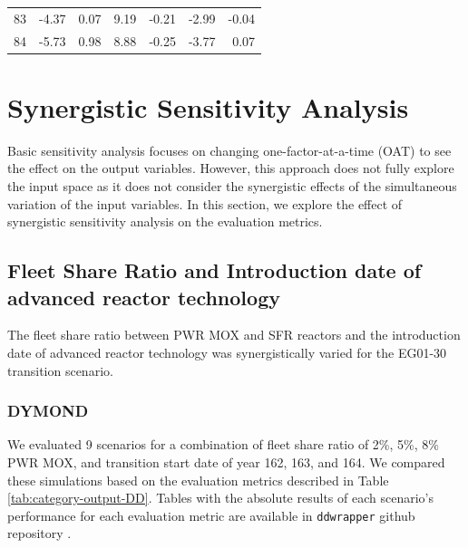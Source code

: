 \begin{table}[]
\begin{tabularx}{\textwidth}{R|RRRRRR}
            83  & -4.37            & 0.07                           & 9.19          & -0.21                       & -2.99             & -0.04                           \\
            84 & -5.73            & 0.98                           & 8.88          & -0.25                       & -3.77             & 0.07                           \\ \hline
           \end{tabularx}%

        \end{table}

\section{Synergistic Sensitivity Analysis}
\label{sec:synergistic}
Basic sensitivity analysis focuses on changing one-factor-at-a-time 
(OAT) to see the effect on the output variables. 
However, this approach does not fully explore the input space as
it does not consider the synergistic effects of the simultaneous 
variation of the input variables.
In this section, we explore the effect of synergistic sensitivity 
analysis on the evaluation metrics.

\subsection{Fleet Share Ratio and Introduction date of advanced 
reactor technology}
The fleet share ratio between PWR MOX and SFR 
reactors and the introduction date of advanced reactor 
technology was synergistically varied for 
the EG01-30 transition scenario. 

\subsubsection{\textbf{DYMOND}}
We evaluated 9 scenarios for a combination of fleet share ratio of 
2\%, 5\%, 8\% PWR MOX, and transition start date of year 162, 163, and 164.
We compared these simulations based on the evaluation 
metrics described in Table \ref{tab:category-output-DD}.
Tables with the absolute results of each scenario's performance 
for each evaluation metric are available in  \texttt{ddwrapper} github repository 
\cite{chee_gwenchee/ddwrapper_2019}. 

